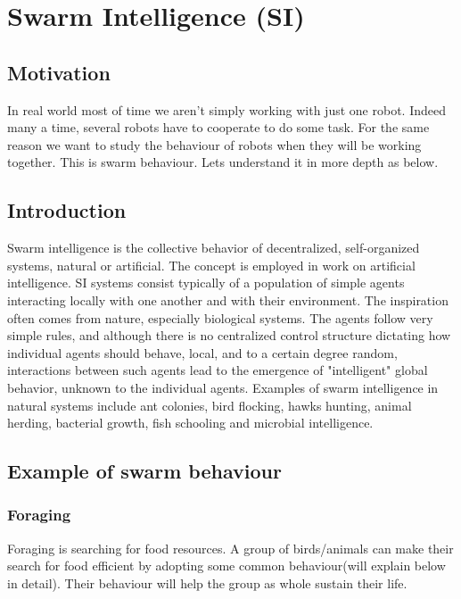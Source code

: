\chapter{Swarm Intelligence (SI)}




\section{Motivation}
    In real world most of time we aren't simply working with just one robot. Indeed many a time, several robots have to cooperate to do some task. For the same reason we want to study the behaviour of robots when they will be working together. This is swarm behaviour. Lets understand it in more depth as below. 



\section{Introduction}
Swarm intelligence is the collective behavior of decentralized, self-organized systems, natural or artificial. The concept is employed in work on artificial intelligence.\cite{SwarmIntelligence}
SI systems consist typically of a population of simple agents interacting locally with one another and with their environment. The inspiration often comes from nature, especially biological systems. The agents follow very simple rules, and although there is no centralized control structure dictating how individual agents should behave, local, and to a certain degree random, interactions between such agents lead to the emergence of "intelligent" global behavior, unknown to the individual agents. Examples of swarm intelligence in natural systems include ant colonies, bird flocking, hawks hunting, animal herding, bacterial growth, fish schooling and microbial intelligence.\cite{SwarmBehaviour}


\section{Example of swarm behaviour}
\subsection{Foraging}
Foraging is searching for food resources. A group of birds/animals can make their search for food efficient by adopting some common behaviour(will explain below in detail). Their behaviour will help the group as whole sustain their life.\cite{Foraging}

